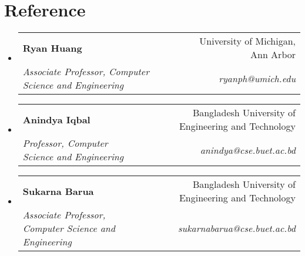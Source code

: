 \documentclass[letterpaper,12pt]{article} %
\makeatletter
\newcommand{\resumeSubheading}[4]{
  \vspace{-2pt}\item
    \begin{tabular*}{0.97\textwidth}[t]{l@{\extracolsep{\fill}}r}
      \textbf{#1} & #2 \\
      \textit{\small#3} & \textit{\small #4} \\
    \end{tabular*}\vspace{-7pt}
}
\newcommand{\resumeSubHeadingListStart}{\begin{itemize}[leftmargin=0.15in, label={}]}
\newcommand{\resumeSubHeadingListEnd}{\end{itemize}}
\makeatother
\begin{document}
\section{Reference}
\resumeSubHeadingListStart
    \resumeSubheading
        {Ryan Huang}{University of Michigan, Ann Arbor}
        {Associate Professor, Computer Science and Engineering}{ryanph@umich.edu}
    \resumeSubheading
        {Anindya Iqbal}{Bangladesh University of Engineering and Technology}
        {Professor, Computer Science and Engineering}{anindya@cse.buet.ac.bd}
    \resumeSubheading
        {Sukarna Barua}{Bangladesh University of Engineering and Technology}
        {Associate Professor, Computer Science and Engineering}{sukarnabarua@cse.buet.ac.bd}
\resumeSubHeadingListEnd
\end{document}
